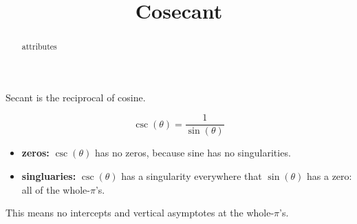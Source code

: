 \documentclass{ximera}
\title{Cosecant}
\begin{document}
\begin{abstract}
attributes
\end{abstract}
\maketitle











Secant is the reciprocal of cosine. 

\[   \csc(\theta)  =  \frac{1}{\sin(\theta)}  \]



\begin{itemize}
\item \textbf{zeros:} $\csc(\theta)$ has no zeros, because sine has no singularities.
\item \textbf{singluaries:} $\csc(\theta)$ has a singularity everywhere that $\sin(\theta)$ has a zero:  all of the whole-$\pi$'s.
\end{itemize}

This means no intercepts and vertical asymptotes at the whole-$\pi$'s.
\end{document}
